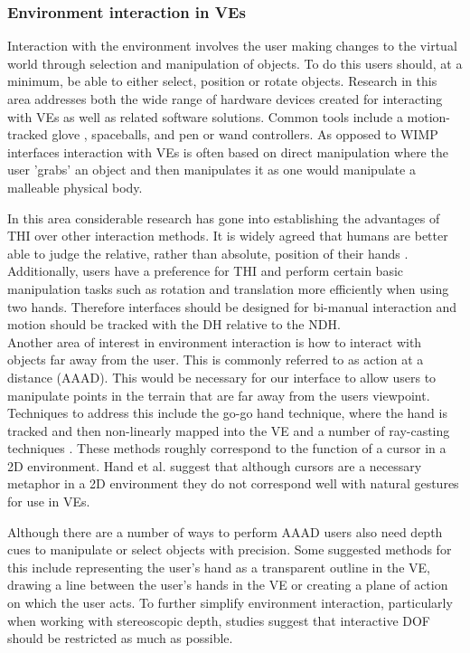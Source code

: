 \documentclass{sig-alternate-05-2015}
\begin{document}
\subsubsection{Environment interaction in VEs}
 Interaction with the environment involves the user making changes to the virtual world through selection and manipulation of objects. To do this users should, at a minimum, be able to either select, position or rotate objects\cite{Bowman2001}. Research in this area addresses both the wide range of hardware devices created for interacting with VEs as well as related software solutions. Common tools include a motion-tracked glove \cite{Zimmerman1986}, spaceballs\cite{Hand1997}, and pen or wand controllers\cite{Schultheis2012}. As opposed to WIMP interfaces interaction with VEs is often based on direct manipulation where the user 'grabs' an object and then manipulates it as one would manipulate a malleable physical body.
  
 In this area considerable research has gone into establishing the advantages of THI over other interaction methods. It is widely agreed that humans are better able to judge the relative, rather than absolute, position of their hands \cite{Bowman1998, Buxton1986}. Additionally, users have a preference for THI\cite{Buxton1986} and perform certain basic manipulation tasks such as rotation and translation more efficiently when using two hands\cite{Schultheis2012,Balakrishnan1999}. Therefore interfaces should be designed for bi-manual interaction and motion should be tracked with the DH relative to the NDH\cite{Hinckley1994}.\\
 
 Another area of interest in environment interaction is how to interact with objects far away from the user. This is commonly referred to as action at a distance (AAAD). This would be necessary for our interface to allow users to manipulate points in the terrain that are far away from the users viewpoint. Techniques to address this include the go-go hand technique\cite{Poupyrev1996}, where the hand is tracked and then non-linearly mapped into the VE and a number of ray-casting techniques \cite{Bowman2001}. These methods roughly correspond to the function of a cursor in a 2D environment. Hand et al.\cite{Hand1997} suggest that although cursors are a necessary metaphor in a 2D environment they do not correspond well with natural gestures for use in VEs.
 
 Although there are a number of ways to perform AAAD users also need depth cues to manipulate or select objects with precision.\cite{Schultheis2012} Some suggested methods for this include representing the user's hand as a transparent outline in the VE\cite{Hinckley1994}, drawing a line between the user's hands in the VE\cite{Schultheis2012} or creating a plane of action\cite{Mine2014} on which the user acts. To further simplify environment interaction, particularly when working with stereoscopic depth, studies suggest that interactive DOF should be restricted as much as possible\cite{Bowman2001}.
\end{document}
